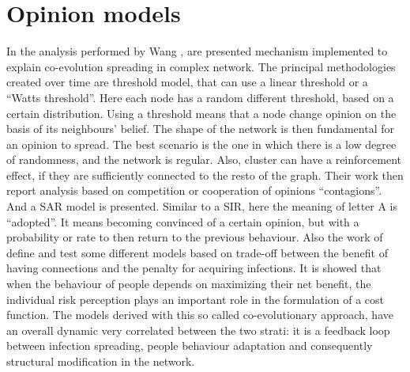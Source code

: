 \section{Opinion models}
In the analysis performed by Wang \cite{Wang_2019}, are presented mechanism implemented to explain co-evolution spreading in complex network. The principal methodologies created over time are threshold model, that can use a linear threshold or a “Watts threshold”. Here each node has a random different threshold, based on a certain distribution. Using a threshold means that a node change opinion on the basis of its neighbours’ belief. The shape of the network is then fundamental for an opinion to spread. The best scenario is the one in which there is a low degree of randomness, and the network is regular. Also, cluster can have a reinforcement effect, if they are sufficiently connected to the resto of the graph. Their work then report analysis based on competition or cooperation of opinions “contagions”. And a SAR model is presented. Similar to a SIR, here the meaning of letter A is “adopted”. It means becoming convinced of a certain opinion, but with a probability or rate to then return to the previous behaviour. Also the work of \cite{Nunner2021} define and test some different models based on trade-off between the benefit of having connections and the penalty for acquiring infections. It is showed that when the behaviour of people depends on maximizing their net benefit, the individual risk perception plays an important role in the formulation of a cost function. The models derived with this so called co-evolutionary approach, have an overall dynamic very correlated between the two strati: it is a feedback loop between infection spreading, people behaviour adaptation and consequently structural modification in the network.



